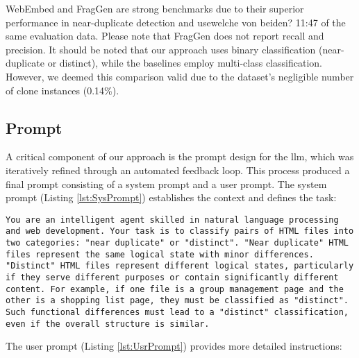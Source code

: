         WebEmbed and FragGen are strong benchmarks due to their superior performance in near-duplicate detection and usewelche von beiden?
11:47
 of the same evaluation data. Please note that FragGen does not report recall and precision.
        It should be noted that our approach uses binary classification (near-duplicate or distinct), while the baselines employ multi-class classification. However, we deemed this comparison valid due to the dataset's negligible number of clone instances (0.14\%).

    \subsection{Prompt}
        \label{sec:approach:sub:proposed:sub:prompt}

        A critical component of our approach is the prompt design for the \ac{llm}, which was iteratively refined through an automated feedback loop. This process produced a final prompt consisting of a system prompt and a user prompt.
        The system prompt (Listing \ref{lst:SysPrompt}) establishes the context and defines the task:
    
    \begin{lstlisting}[breaklines, caption={Final System Prompt},captionpos=b, label={lst:SysPrompt}]
    You are an intelligent agent skilled in natural language processing and web development. Your task is to classify pairs of HTML files into two categories: "near duplicate" or "distinct". "Near duplicate" HTML files represent the same logical state with minor differences. "Distinct" HTML files represent different logical states, particularly if they serve different purposes or contain significantly different content. For example, if one file is a group management page and the other is a shopping list page, they must be classified as "distinct". Such functional differences must lead to a "distinct" classification, even if the overall structure is similar.
    \end{lstlisting}
    The user prompt (Listing \ref{lst:UsrPrompt}) provides more detailed instructions:

